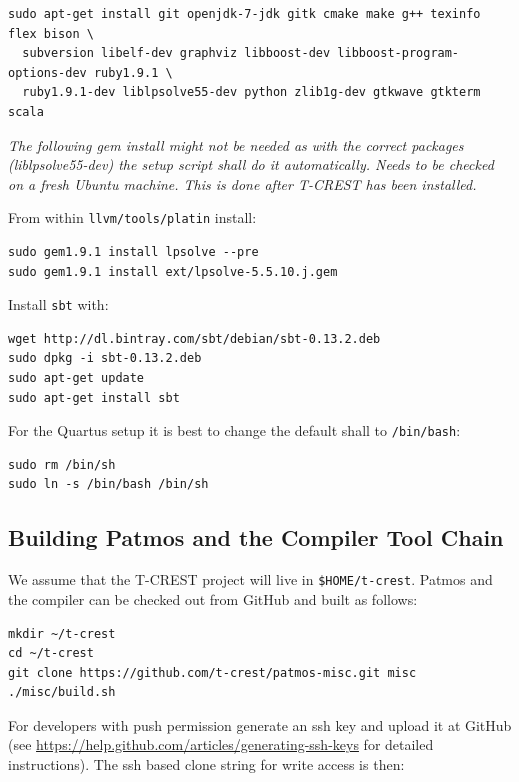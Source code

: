 \documentclass[a4paper,fontsize=10pt,twoside,DIV15,BCOR12mm,headinclude=true,footinclude=false,pagesize,bibtotoc]{scrbook}
\newcommand{\code}[1]{{\texttt{#1}}}
\begin{document}
\begin{verbatim}
sudo apt-get install git openjdk-7-jdk gitk cmake make g++ texinfo flex bison \
  subversion libelf-dev graphviz libboost-dev libboost-program-options-dev ruby1.9.1 \
  ruby1.9.1-dev liblpsolve55-dev python zlib1g-dev gtkwave gtkterm scala
\end{verbatim}

\emph{The following gem install might not be needed as with the correct
packages (liblpsolve55-dev) the setup script shall do it automatically.
Needs to be checked on a fresh Ubuntu machine.
This is done after T-CREST has been installed.}

From within \code{llvm/tools/platin} install:

\begin{verbatim}
sudo gem1.9.1 install lpsolve --pre
sudo gem1.9.1 install ext/lpsolve-5.5.10.j.gem
\end{verbatim}

Install \code{sbt} with:

\begin{verbatim}
wget http://dl.bintray.com/sbt/debian/sbt-0.13.2.deb
sudo dpkg -i sbt-0.13.2.deb
sudo apt-get update
sudo apt-get install sbt
\end{verbatim}

For the Quartus setup it is best to change the default shall to \code{/bin/bash}:

\begin{verbatim}
sudo rm /bin/sh
sudo ln -s /bin/bash /bin/sh
\end{verbatim}


\subsection{Building Patmos and the Compiler Tool Chain}
\label{sec:build:compiler}

We assume that the T-CREST project will live in \code{\$HOME/t-crest}.
Patmos and the compiler can be checked out from GitHub and built as follows:

\begin{verbatim}
mkdir ~/t-crest
cd ~/t-crest
git clone https://github.com/t-crest/patmos-misc.git misc
./misc/build.sh
\end{verbatim}

For developers with push permission generate an ssh key and upload
it at GitHub (see \url{https://help.github.com/articles/generating-ssh-keys}
for detailed instructions).
The ssh based clone string for write access is then:
\end{document}
